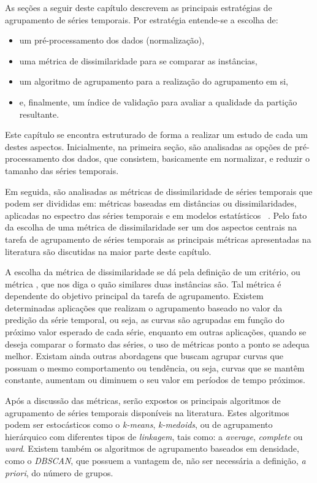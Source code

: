 As seções a seguir deste capítulo descrevem as principais estratégias de agrupamento de séries temporais. Por estratégia entende-se a escolha de:
\begin{itemize}
	\item um pré-processamento dos dados (normalização),
	\item uma métrica de dissimilaridade para se comparar as instâncias,
	\item um algoritmo de agrupamento para a realização do agrupamento em si,
	\item e, finalmente, um índice de validação para avaliar a qualidade da partição resultante.
\end{itemize}
Este capítulo se encontra estruturado de forma a realizar um estudo de cada um destes aspectos. Inicialmente, na primeira seção, são analisadas as opções de pré-processamento dos dados, que consistem, basicamente em normalizar, e reduzir o tamanho das séries temporais.

 Em seguida, são analisadas as métricas de dissimilaridade de séries temporais que podem ser divididas em: métricas baseadas em distâncias ou dissimilaridades, aplicadas no espectro das séries temporais e em modelos estatísticos ~\parencite{Liao}. Pelo fato da escolha de uma métrica de dissimilaridade ser um dos aspectos centrais na tarefa de agrupamento  de séries temporais as principais métricas apresentadas na literatura são discutidas na maior parte deste capítulo.
 
 A escolha da métrica de dissimilaridade se dá pela definição de um critério, ou métrica , que nos diga o quão similares duas instâncias são. Tal métrica é dependente do objetivo principal da tarefa de agrupamento. Existem determinadas aplicações que realizam o agrupamento baseado no valor da predição da série temporal, ou seja, as curvas são agrupadas em função do próximo valor esperado de cada série, enquanto em outras aplicações, quando se deseja comparar o formato das séries, o uso de métricas ponto a ponto se adequa melhor. Existam ainda outras abordagens que buscam agrupar curvas que possuam o mesmo comportamento ou tendência, ou seja, curvas que se mantêm constante, aumentam ou diminuem o seu valor em períodos de tempo próximos.

Após a discussão das métricas, serão expostos os principais algoritmos de agrupamento de séries temporais disponíveis na literatura. Estes algoritmos podem ser estocásticos como o \emph{k-means}, \emph{k-medoids}, ou de agrupamento hierárquico com diferentes tipos de \emph{linkagem}, tais como: a \emph{average}, \emph{complete} ou \emph{ward}. Existem também os algoritmos de agrupamento baseados em densidade, como o \emph{DBSCAN}, que possuem a vantagem de, não ser necessária a definição, \emph{a priori}, do número de grupos.

